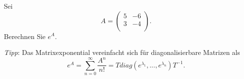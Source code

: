 \newpage

\subsubsection{} %

Sei \[ A = \begin{pmatrix} 5 & -6 \\ 3 & -4 \\ \end{pmatrix}. \] Berechnen Sie \( e^A \).

\vspace{1\baselineskip}

\textit{Tipp}: Das Matrixexponential vereinfacht sich für diagonalisierbare Matrizen als 
\[e^A = \sum_{n=0}^{\infty} \frac{A^n}{n!} = Tdiag(e^{\lambda_1}, ..., e^{\lambda_n})T^{-1}.\]

\vspace{1\baselineskip}

